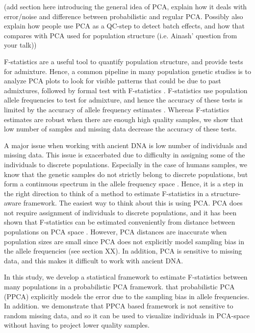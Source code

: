 \documentclass[12pt, letterpaper]{article}
\begin{document}
(add section here introducing the general idea of PCA, explain how it deals with error/noise  and difference between probabilistic and regular PCA. Possibly also explain how people use PCA as a QC-step to detect batch effects, and how that compares with PCA used for population structure (i.e. Ainash' question from your talk))

F-statistics are a useful tool to quantify population structure, and provide tests for admixture. Hence, a common pipeline in many population genetic studies is to analyze PCA plots to look for visible patterns that could be due to past admixtures, followed by formal test with F-statistics \cite{lazaridis_ancient_2014,lazaridis_genomic_2016}. F-statistics use population allele frequencies to test for admixture, and hence the accuracy of these tests is limited by the accuracy of allele frequency estimates \cite{peter_admixture_2016}. Whereas F-statistics estimates are robust when there are enough high quality samples, we show that low number of samples and missing data decrease the accuracy of these tests.

A major issue when working with ancient DNA is low number of individuals and missing data. This issue is exacerbated due to difficulty in assigning some of the individuals to discrete populations. Especially in the case of humans samples, we know that the genetic samples do not strictly belong to discrete populations, but form a continuous spectrum in the allele frequency space \cite{oteo-garcia_geometrical_2021}. Hence, it is a step in the right direction to think of a method to estimate F-statistics in a structure-aware framework. The easiest way to think about this is using PCA. PCA does not require assignment of individuals to discrete populations, and it has been shown that F-statistics can be estimated conveniently from distance between populations on PCA space \cite{peter_geometric_2022}. However, PCA distances are inaccurate when population sizes are small since PCA does not explicitly model sampling bias in the allele frequencies (see section XX). In addition, PCA is sensitive to missing data, and this makes it difficult to work with ancient DNA. 



In this study, we develop a statistical framework to estimate F-statistics between many populations in a probabilistic PCA framework.  that probabilistic PCA (PPCA) explicitly models the error due to the sampling bias in allele frequencies. In addition. we demonstrate that PPCA based framework is not sensitive to random missing data, and so it can be used to visualize individuals in PCA-space without having to project lower quality samples.
\end{document}
